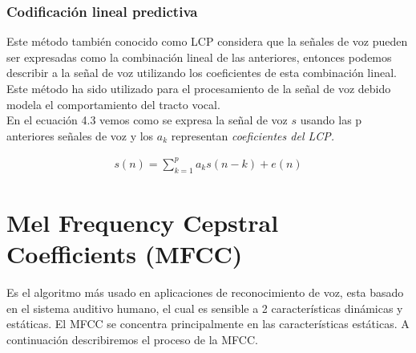 \subsubsection{Codificación lineal predictiva} 
Este método también conocido como LCP considera que la señales de voz pueden ser expresadas como la combinación lineal de las anteriores, entonces podemos describir a la señal de voz utilizando los coeficientes de esta combinación lineal. Este método ha sido utilizado para el procesamiento de la señal de voz debido modela el comportamiento del tracto vocal.\\ En el ecuación 4.3 vemos como se expresa la señal de voz $s$ usando las p anteriores señales de voz y los $a_{k}$ representan \textit{coeficientes del LCP.}

\begin{equation}
\label{LPC}
\begin{aligned}
s(n)= \sum_{k=1}^{p}a_{k}s(n-k)+e(n)
\end{aligned}
\end{equation}

\section{Mel Frequency Cepstral Coefficients (MFCC)}
Es el algoritmo más usado en aplicaciones de reconocimiento de voz, esta basado en el sistema auditivo humano, el cual es sensible a 2 características dinámicas y estáticas. El MFCC se concentra principalmente en las características estáticas. A continuación describiremos el proceso de la MFCC.

